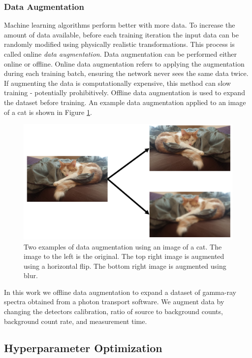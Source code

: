 \subsubsection{Data Augmentation}

Machine learning algorithms perform better with more data. To increase the amount of data available, before each training iteration the input data can be randomly modified using physically realistic transformations. This process is called online \textit{data augmentation}. Data augmentation can be performed either online or offline. Online data augmentation refers to applying the augmentation during each training batch, ensuring the network never sees the same data twice. If augmenting the data is computationally expensive, this method can slow training - potentially prohibitively. Offline data augmentation is used to expand the dataset before training. An example data augmentation applied to an image of a cat is shown in Figure \ref{fig:cat}.

\begin{figure}[H]
	\centering
	\includegraphics[width=0.9\linewidth]{images/cat}
	\caption{Two examples of data augmentation using an image of a cat. The image to the left is the original. The top right image is augmented using a horizontal flip. The bottom right image is augmented using blur.}
	\label{fig:cat}
\end{figure}

In this work we offline data augmentation to expand a dataset of gamma-ray spectra obtained from a photon transport software. We augment data by changing the detectors calibration, ratio of source to background counts, background count rate, and measurement time.


\subsection{Hyperparameter Optimization} \label{section_hp_opt}

